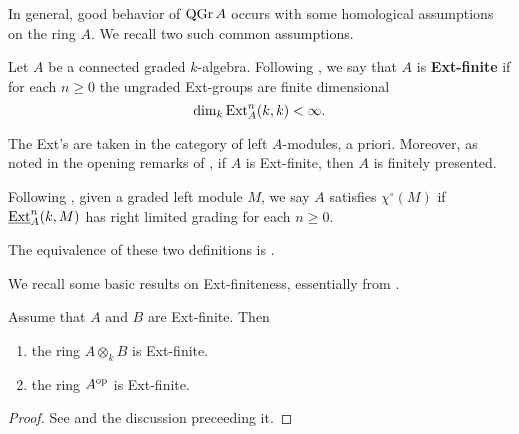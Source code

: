 In general, good behavior of \(\operatorname{QGr}A\) occurs with some homological assumptions on the ring \(A\). We recall two such common assumptions. 

\begin{definition} \label{definition: Ext-finite}
  Let \(A\) be a connected graded \(k\)-algebra. Following \textcite{VdB}, we say that \(A\) is \textbf{Ext-finite} if for each \(n \geq 0\) the ungraded Ext-groups are finite dimensional 
  \begin{displaymath}
    \operatorname{dim}_k \operatorname{Ext}_A^n (k,k) < \infty.
  \end{displaymath}
\end{definition}

\begin{remark}
  The Ext's are taken in the category of left \(A\)-modules, a priori.
  Moreover, as noted in the opening remarks of \textcite[Section 4.1]{BVdB}, if \(A\) is Ext-finite, then \(A\) is finitely presented.
\end{remark}

\begin{definition} \label{definition: chi}
  Following \textcite{AZ94}, given a graded left module \(M\), we say \(A\) satisfies \(\chi^\circ(M)\) if \(\underline{\operatorname{Ext}}^n_A(k,M)\) has right limited grading for each \(n \geq 0\). 

\end{definition}

\begin{remark}
  The equivalence of these two definitions is \textcite[Proposition 3.8 (1)]{AZ94}.
\end{remark}

We recall some basic results on Ext-finiteness, essentially from \textcite[Section 4]{VdB}.

\begin{proposition} \label{proposition: tensor and op properties of ext-finite}
  Assume that \(A\) and \(B\) are Ext-finite. Then
  \begin{enumerate}
  \item the ring \(A \otimes_k B\) is Ext-finite. 
  \item the ring \(A^{\operatorname{op}}\) is Ext-finite.
  \end{enumerate}
\end{proposition}

\begin{proof}
  See \textcite[Lemma 4.2]{VdB} and the discussion preceeding it. 
\end{proof}

